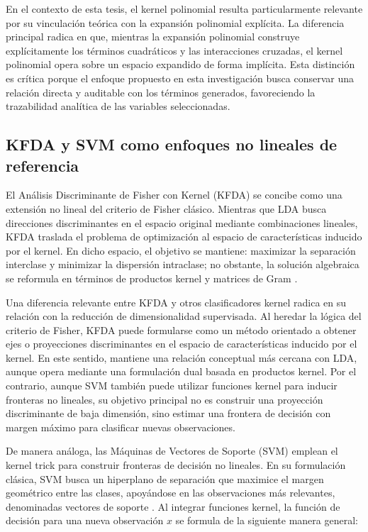 En el contexto de esta tesis, el kernel polinomial resulta particularmente relevante por su vinculación teórica con la expansión polinomial explícita. La diferencia principal radica en que, mientras la expansión polinomial construye explícitamente los términos cuadráticos y las interacciones cruzadas, el kernel polinomial opera sobre un espacio expandido de forma implícita. Esta distinción es crítica porque el enfoque propuesto en esta investigación busca conservar una relación directa y auditable con los términos generados, favoreciendo la trazabilidad analítica de las variables seleccionadas.

\subsection{KFDA y SVM como enfoques no lineales de referencia}

El Análisis Discriminante de Fisher con Kernel (KFDA) se concibe como una extensión no lineal del criterio de Fisher clásico. Mientras que LDA busca direcciones discriminantes en el espacio original mediante combinaciones lineales, KFDA traslada el problema de optimización al espacio de características inducido por el kernel. En dicho espacio, el objetivo se mantiene: maximizar la separación interclase y minimizar la dispersión intraclase; no obstante, la solución algebraica se reformula en términos de productos kernel y matrices
de Gram \cite{mika1999fisher}.

Una diferencia relevante entre KFDA y otros clasificadores kernel radica en su relación con la reducción de dimensionalidad supervisada. Al heredar la lógica del criterio de Fisher, KFDA puede formularse como un método orientado a obtener ejes o proyecciones discriminantes en el espacio de características inducido por el kernel. En este sentido, mantiene una relación conceptual más cercana con LDA, aunque opera mediante una formulación dual basada en productos kernel. Por el contrario, aunque SVM también puede utilizar funciones kernel para inducir fronteras no lineales, su objetivo principal no es construir una proyección discriminante de baja dimensión, sino estimar una frontera de decisión con margen máximo para clasificar nuevas observaciones.

De manera análoga, las Máquinas de Vectores de Soporte (SVM) emplean el kernel trick para construir fronteras de decisión no lineales. En su formulación clásica, SVM busca un hiperplano de separación que maximice el margen geométrico entre las clases, apoyándose en las observaciones más relevantes, denominadas vectores de soporte \cite{cortes1995support}. Al integrar funciones kernel, la función de decisión para una nueva observación $x$ se formula de la siguiente manera general:


